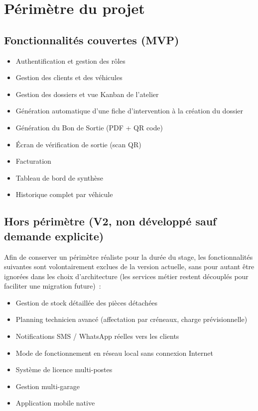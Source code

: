 \documentclass[11pt,a4paper]{report}
\begin{document}
\section{Périmètre du projet}

\subsection{Fonctionnalités couvertes (MVP)}

\begin{itemize}[leftmargin=1cm]
\item Authentification et gestion des rôles
\item Gestion des clients et des véhicules
\item Gestion des dossiers et vue Kanban de l'atelier
\item Génération automatique d'une fiche d'intervention à la création du dossier
\item Génération du Bon de Sortie (PDF + QR code)
\item Écran de vérification de sortie (scan QR)
\item Facturation
\item Tableau de bord de synthèse
\item Historique complet par véhicule
\end{itemize}

\subsection{Hors périmètre (V2, non développé sauf demande explicite)}

Afin de conserver un périmètre réaliste pour la durée du stage, les fonctionnalités
suivantes sont volontairement exclues de la version actuelle, sans pour autant être
ignorées dans les choix d'architecture (les services métier restent découplés pour
faciliter une migration future)~:

\begin{itemize}[leftmargin=1cm]
\item Gestion de stock détaillée des pièces détachées
\item Planning technicien avancé (affectation par créneaux, charge prévisionnelle)
\item Notifications SMS / WhatsApp réelles vers les clients
\item Mode de fonctionnement en réseau local sans connexion Internet
\item Système de licence multi-postes
\item Gestion multi-garage
\item Application mobile native
\end{itemize}
\end{document}
